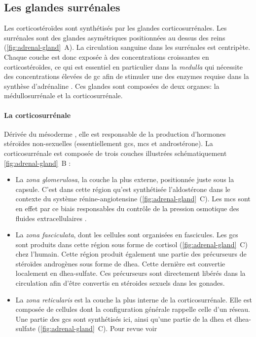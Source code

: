 \documentclass[../main.tex]{subfiles}
\begin{document}

\subsection{Les glandes surrénales}
Les corticostéroïdes sont synthétisés par les glandes corticosurrénales.
Les surrénales sont des glandes asymétriques positionnées au dessus des reins (\autoref{fig:adrenal-gland}~A).
La circulation sanguine dans les surrénales est centripète.
Chaque couche est donc exposée à des concentrations croissantes en corticostéroïdes, ce qui est essentiel en particulier dans la \textit{medulla} qui nécessite des concentrations élevées de \gls{gc} afin de stimuler une des enzymes requise dans la synthèse d'adrénaline \citep{Nussey2001}.
Ces glandes sont composées de deux organes: la médullosurrénale et la corticosurrénale.



\paragraph{La corticosurrénale}
Dérivée du mésoderme \citep{Hammer2005}, elle est responsable de la production d'hormones stéroïdes non-sexuelles (essentiellement \glspl{gc}, \glspl{mc} et androstérone).
La corticosurrénale est composée de trois couches illustrées schématiquement \autoref{fig:adrenal-gland}~B \citep{Charlton1990,Parker1993} :
\begin{itemize}
\item La \textit{zona glomerulosa}, la couche la plus externe, positionnée juste sous la capsule.
C'est dans cette région qu'est synthétisée l'aldostérone dans le contexte du système rénine-angiotensine (\autoref{fig:adrenal-gland}~C).
Les \glspl{mc} sont en effet par ce biais responsables du contrôle de la pression osmotique des fluides extracellulaires \citep{Feraco2013}.
\item La \textit{zona fasciculata}, dont les cellules sont organisées en fascicules. Les \glspl{gc} sont produits dans cette région sous forme de cortisol (\autoref{fig:adrenal-gland}~C) chez l'humain.
Cette région produit également une partie des précurseurs de stéroïdes androgènes sous forme de \gls{dhea}.
Cette dernière est convertie localement en \gls{dhea}-sulfate.
Ces précurseurs sont directement libérés dans la circulation afin d'être convertis en stéroides sexuels dans les gonades.
\item La \textit{zona reticularis} est la couche la plus interne de la corticosurrénale.
Elle est composée de cellules dont la configuration générale rappelle celle d'un réseau.
Une partie des \glspl{gc} sont synthétisés ici, ainsi qu'une partie de la \gls{dhea} et \gls{dhea}-sulfate (\autoref{fig:adrenal-gland}~C).
Pour revue voir \citep{McKay2003a}
\end{itemize}
\end{document}
